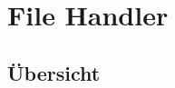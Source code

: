 \documentclass[parskip=full]{scrartcl}
\begin{document}
\section{File Handler}
\subsection{Übersicht}
\end{document}
